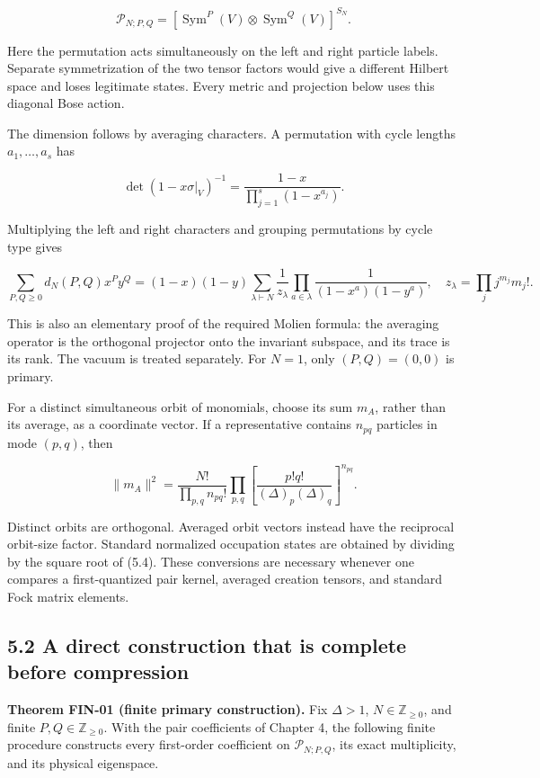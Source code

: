 \[
\mathcal P_{N;P,Q}
=\left[\operatorname{Sym}^P(V)\otimes
\operatorname{Sym}^Q(V)\right]^{S_N}.
\tag{5.2}
\]

Here the permutation acts simultaneously on the left and right particle labels. Separate symmetrization of the two tensor factors would give a different Hilbert space and loses legitimate states. Every metric and projection below uses this diagonal Bose action.

The dimension follows by averaging characters. A permutation with cycle lengths \(a_1,\ldots,a_s\) has

\[
\det(1-x\sigma|_V)^{-1}
=\frac{1-x}{\prod_{j=1}^s(1-x^{a_j})}.
\]

Multiplying the left and right characters and grouping permutations by cycle type gives

\[
\sum_{P,Q\ge0}d_N(P,Q)x^Py^Q
=(1-x)(1-y)\sum_{\lambda\vdash N}
\frac1{z_\lambda}\prod_{a\in\lambda}
\frac1{(1-x^a)(1-y^a)},
\quad z_\lambda=\prod_j j^{m_j}m_j!.
\tag{5.3}
\]

This is also an elementary proof of the required Molien formula: the averaging operator is the orthogonal projector onto the invariant subspace, and its trace is its rank. The vacuum is treated separately. For \(N=1\), only \((P,Q)=(0,0)\) is primary.

For a distinct simultaneous orbit of monomials, choose its sum \(m_A\), rather than its average, as a coordinate vector. If a representative contains \(n_{pq}\) particles in mode \((p,q)\), then

\[
\|m_A\|^2=
\frac{N!}{\prod_{p,q}n_{pq}!}
\prod_{p,q}\left[\frac{p!q!}{(\Delta)_p(\Delta)_q}\right]^{n_{pq}}.
\tag{5.4}
\]

Distinct orbits are orthogonal. Averaged orbit vectors instead have the reciprocal orbit-size factor. Standard normalized occupation states are obtained by dividing by the square root of (5.4). These conversions are necessary whenever one compares a first-quantized pair kernel, averaged creation tensors, and standard Fock matrix elements.

\hypertarget{a-direct-construction-that-is-complete-before-compression}{%
\subsection{5.2 A direct construction that is complete before compression}\label{a-direct-construction-that-is-complete-before-compression}}

\textbf{Theorem FIN-01 (finite primary construction).} Fix \(\Delta>1\), \(N\in\mathbb Z_{\ge0}\), and finite \(P,Q\in\mathbb Z_{\ge0}\). With the pair coefficients of Chapter 4, the following finite procedure constructs every first-order coefficient on \(\mathcal P_{N;P,Q}\), its exact multiplicity, and its physical eigenspace.


